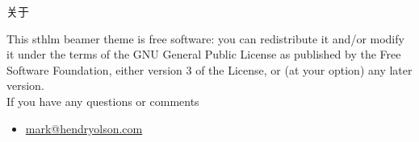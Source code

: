 \documentclass[newPxFont,sthlmFooter]{beamer}
\begin{document}
%
%

\begin{frame}{关于}

This sthlm beamer theme is free software: you can redistribute it and/or modify
it under the terms of the GNU General Public License as published by
the Free Software Foundation, either version 3 of the License, or
(at your option) any later version.\\

If you have any questions or comments
\begin{itemize}
	\item \url{mark@hendryolson.com}
\end{itemize}
\end{frame}
\end{document}
